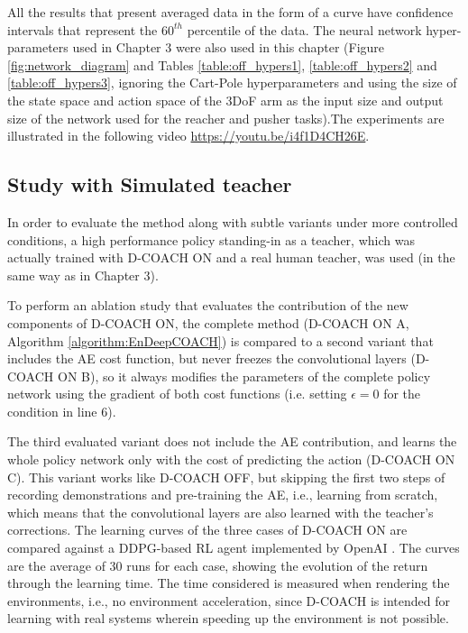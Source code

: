 All the results that present averaged data in the form of a curve have confidence intervals that represent the $60^{th}$ percentile of the data.
The neural network hyper-parameters used in Chapter 3 were also used in this chapter (Figure \ref{fig:network_diagram} and Tables \ref{table:off_hypers1}, \ref{table:off_hypers2} and \ref{table:off_hypers3}, ignoring the Cart-Pole hyperparameters and using the size of the state space and action space of the 3DoF arm as the input size and output size of the network used for the reacher and pusher tasks).The experiments are illustrated in the following video \url{https://youtu.be/i4f1D4CH26E}. 

\subsection{Study with Simulated teacher}
In order to evaluate the method along with subtle variants under more controlled conditions, a high performance policy standing-in as a teacher, which was actually trained with $\text{D-COACH ON}$ and a real human teacher, was used (in the same way as in Chapter 3).

To perform an ablation study that evaluates the contribution of the new components of D-COACH ON, the complete method (D-COACH ON A, Algorithm \ref{algorithm:EnDeepCOACH}) is compared to a second variant that includes the AE cost function, but never freezes the convolutional layers (D-COACH ON B), so it always modifies the parameters of the complete policy network using the gradient of both cost functions (i.e. setting $\epsilon=0$ for the condition in line 6). 

The third evaluated variant does not include the AE contribution, and learns the whole policy network only with the cost of predicting the action (D-COACH ON C). This variant works like D-COACH OFF, but skipping the first two steps of recording demonstrations and pre-training the AE, i.e., learning from scratch, which means that the convolutional layers are also learned with the teacher's corrections. The learning curves of the three cases of D-COACH ON are compared against a DDPG-based RL agent \cite{Lillicrap2015} implemented by OpenAI \cite{baselines}. The curves are the average of 30 runs for each case, showing the evolution of the return through the learning time. The time considered is measured when rendering the environments, i.e., no environment acceleration, since D-COACH is intended for learning with real systems wherein speeding up the environment is not possible.

